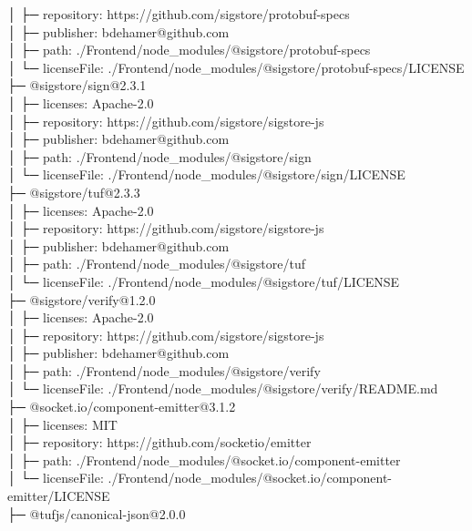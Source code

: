 \documentclass[
    paper=a4,
    twoside=false,
    parskip=half,
    listof=entryprefix,
    listof=totoc,
    index=totoc,
    bibliography=totoc,
    headsepline,
]{scrbook}
\begin{document}
    │  ├─ repository: https://github.com/sigstore/protobuf-specs\\
    │  ├─ publisher: bdehamer@github.com\\
    │  ├─ path: ./Frontend/node\_modules/@sigstore/protobuf-specs\\
    │  └─ licenseFile: ./Frontend/node\_modules/@sigstore/protobuf-specs/LICENSE\\
    ├─ @sigstore/sign@2.3.1\\
    │  ├─ licenses: Apache-2.0\\
    │  ├─ repository: https://github.com/sigstore/sigstore-js\\
    │  ├─ publisher: bdehamer@github.com\\
    │  ├─ path: ./Frontend/node\_modules/@sigstore/sign\\
    │  └─ licenseFile: ./Frontend/node\_modules/@sigstore/sign/LICENSE\\
    ├─ @sigstore/tuf@2.3.3\\
    │  ├─ licenses: Apache-2.0\\
    │  ├─ repository: https://github.com/sigstore/sigstore-js\\
    │  ├─ publisher: bdehamer@github.com\\
    │  ├─ path: ./Frontend/node\_modules/@sigstore/tuf\\
    │  └─ licenseFile: ./Frontend/node\_modules/@sigstore/tuf/LICENSE\\
    ├─ @sigstore/verify@1.2.0\\
    │  ├─ licenses: Apache-2.0\\
    │  ├─ repository: https://github.com/sigstore/sigstore-js\\
    │  ├─ publisher: bdehamer@github.com\\
    │  ├─ path: ./Frontend/node\_modules/@sigstore/verify\\
    │  └─ licenseFile: ./Frontend/node\_modules/@sigstore/verify/README.md\\
    ├─ @socket.io/component-emitter@3.1.2\\
    │  ├─ licenses: MIT\\
    │  ├─ repository: https://github.com/socketio/emitter\\
    │  ├─ path: ./Frontend/node\_modules/@socket.io/component-emitter\\
    │  └─ licenseFile: ./Frontend/node\_modules/@socket.io/component-emitter/LICENSE\\
    ├─ @tufjs/canonical-json@2.0.0\\
\end{document}
